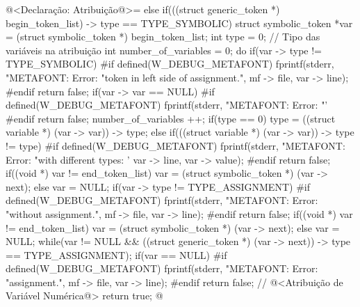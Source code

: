 \iniciocodigo
@<Declaração: Atribuição@>=
else if(((struct generic_token *) begin_token_list) -> type ==
        TYPE_SYMBOLIC){
  struct symbolic_token *var = (struct symbolic_token *) begin_token_list;
  int type = 0; // Tipo das variáveis na atribuição
  int number_of_variables = 0;
  do{
    if(var -> type != TYPE_SYMBOLIC){
#if defined(W_DEBUG_METAFONT)
      fprintf(stderr, "METAFONT: Error: %
              "token in left side of assignment.\n", mf -> file,
              var -> line);
#endif
      return false;
    }
    if(var -> var == NULL){
#if defined(W_DEBUG_METAFONT)
      fprintf(stderr, "METAFONT: Error: %
              "'%
#endif
      return false;
    }
    number_of_variables ++;
    if(type == 0)
      type = ((struct variable *) (var -> var)) -> type;
    else if(((struct variable *) (var -> var)) -> type != type){
#if defined(W_DEBUG_METAFONT)
      fprintf(stderr, "METAFONT: Error: %
              "with different types: '%
              var -> line, var -> value);
#endif
      return false;    
    }
    if((void *) var != end_token_list)
      var = (struct symbolic_token *) (var -> next);
    else
      var = NULL;
    if(var -> type != TYPE_ASSIGNMENT){
#if defined(W_DEBUG_METAFONT)
      fprintf(stderr, "METAFONT: Error: %
              "without assignment.\n", mf -> file, var -> line);
#endif
      return false;    
    }
    if((void *) var != end_token_list)
      var = (struct symbolic_token *) (var -> next);
    else
      var = NULL;
  } while(var != NULL &&
          ((struct generic_token *) (var -> next)) -> type ==
          TYPE_ASSIGNMENT);
  if(var == NULL){
#if defined(W_DEBUG_METAFONT)
      fprintf(stderr, "METAFONT: Error: %
              "assignment.\n", mf -> file, var -> line);
#endif
      return false;
  }
  // @<Atribuição de Variável Numérica@>
  return true;
}
@
\fimcodigo

